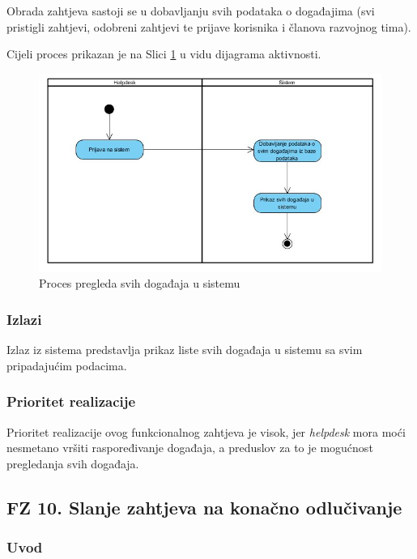 \documentclass[12pt,a4paper]{article}
\begin{document}
Obrada zahtjeva sastoji se u dobavljanju svih podataka o događajima (svi pristigli zahtjevi, odobreni zahtjevi te prijave korisnika i članova razvojnog tima).

Cijeli proces prikazan je na Slici \ref{act9} u vidu dijagrama aktivnosti.

\begin{figure}[H]
\center
\includegraphics[scale=0.5]{../res/Activity/activity9.JPG}
\caption{Proces pregleda svih događaja u sistemu}
\label{act9}
\end{figure}

\subsubsection{Izlazi}

Izlaz iz sistema predstavlja prikaz liste svih događaja u sistemu sa svim pripadajućim podacima.

\subsubsection{Prioritet realizacije}

Prioritet realizacije ovog funkcionalnog zahtjeva je visok, jer \textit{helpdesk} mora moći nesmetano vršiti raspoređivanje događaja, a preduslov za to je mogućnost pregledanja svih događaja.

\subsection{FZ 10. Slanje zahtjeva na konačno odlučivanje}

\subsubsection{Uvod}
\end{document}
